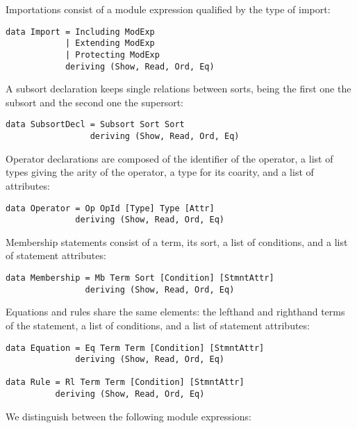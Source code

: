Importations consist of a module expression qualified by the type
of import:

{\codesize
\begin{verbatim}
data Import = Including ModExp
            | Extending ModExp
            | Protecting ModExp
            deriving (Show, Read, Ord, Eq)
\end{verbatim}
}

A subsort declaration keeps single relations between sorts, being
the first one the subsort and the second one the supersort:

{\codesize
\begin{verbatim}
data SubsortDecl = Subsort Sort Sort
                 deriving (Show, Read, Ord, Eq)
\end{verbatim}
}

Operator declarations are composed of the identifier of the
operator, a list of types giving the arity of the operator,
a type for its coarity, and a list of attributes:

{\codesize
\begin{verbatim}
data Operator = Op OpId [Type] Type [Attr]
              deriving (Show, Read, Ord, Eq)
\end{verbatim}
}

Membership statements consist of a term, its sort, a list
of conditions, and a list of statement attributes:

{\codesize
\begin{verbatim}
data Membership = Mb Term Sort [Condition] [StmntAttr]
                deriving (Show, Read, Ord, Eq)
\end{verbatim}
}

Equations and rules share the same elements: the lefthand
and righthand terms of the statement, a list of conditions,
and a list of statement attributes:

{\codesize
\begin{verbatim}
data Equation = Eq Term Term [Condition] [StmntAttr]
              deriving (Show, Read, Ord, Eq)

data Rule = Rl Term Term [Condition] [StmntAttr]
          deriving (Show, Read, Ord, Eq)
\end{verbatim}
}

We distinguish between the following module expressions:

